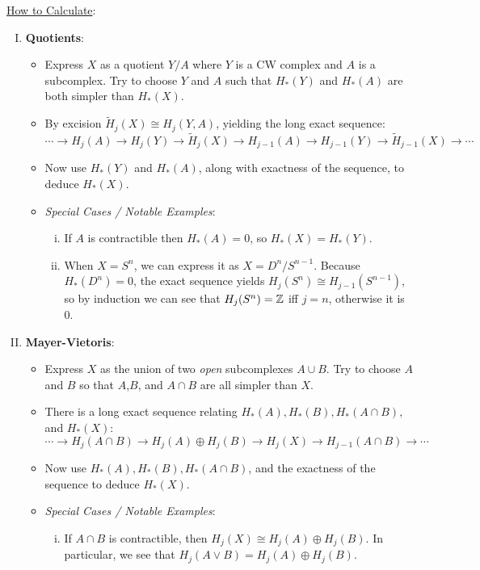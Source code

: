 \documentclass{amsart}
\begin{document}
	\underline{How to Calculate}: 
	\begin{enumerate}[(I)]
		\item \textbf{Quotients}: 
		\begin{itemize}
			\item Express $X$ as a quotient $Y/A$ where $Y$ is a CW complex and $A$ is a subcomplex. Try to choose $Y$ and $A$ such that $H_*(Y)$ and $H_*(A)$ are both simpler than $H_*(X)$.
			\item By excision $\tilde{H}_j(X) \cong H_j(Y,A)$, yielding the long exact sequence:
			$$
			\cdots \to H_j(A) \to H_j(Y) \to \tilde{H}_j(X) \to H_{j-1}(A)\to H_{j-1}(Y)\to \tilde{H}_{j-1}(X)\to \cdots 
			$$
			\item Now use $H_*(Y)$ and $H_*(A)$, along with exactness of the sequence, to deduce $H_*(X)$.
			\item \textit{Special Cases / Notable Examples}: 
			\begin{enumerate}[(i)]
				\item If $A$ is contractible then $H_*(A)=0$, so $H_*(X)=H_*(Y)$.
				\item When $X=S^n$, we can express it as $X=D^n/S^{n-1}$. Because $H_*(D^n)=0$, the exact sequence yields $H_j(S^n)\cong H_{j-1}(S^{n-1})$, so by induction we can see that $H_j(S^n)=\mathbb{Z}$ iff $j=n$, otherwise it is 0.
			\end{enumerate}
		\end{itemize} 
		\item \textbf{Mayer-Vietoris}:
		\begin{itemize}
			\item Express $X$ as the union of two \textit{open} subcomplexes $A\cup B$. Try to choose $A$ and $B$ so that $A$,$B$, and $A\cap B$ are all simpler than $X$.
			\item There is a long exact sequence relating $H_*(A),H_*(B),H_*(A\cap B),$ and $H_*(X)$:
			$$
			\cdots \to H_j(A\cap B) \to H_j(A)\oplus H_j(B) \to H_j(X) \to H_{j-1}(A\cap B)\to \cdots
			$$ 
			\item Now use $H_*(A),H_*(B),H_*(A\cap B)$, and the exactness of the sequence to deduce $H_*(X)$.
			\item \textit{Special Cases / Notable Examples}:
			\begin{enumerate}[(i)]
				\item If $A\cap B$ is contractible, then $H_j(X)\cong H_j(A)\oplus H_j(B)$. In particular, we see that $H_j(A\vee B) = H_j(A)\oplus H_j(B)$.
			\end{enumerate}
		\end{itemize}

\end{enumerate}
\end{document}
